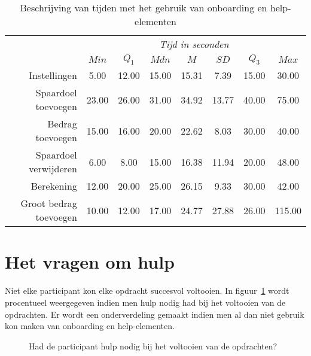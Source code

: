 \begin{table}[]
	\centering
	\begin{tabular}{r|ccccccc}
		\multicolumn{1}{l|}{} & \multicolumn{7}{c}{\textit{Tijd in seconden}} \\
		& $Min$ & $Q_1$ & $Mdn$ & $M$ & $SD$ & $Q_3$ & $Max$ \\ \hline
		Instellingen & 5.00 & 12.00 & 15.00 & 15.31 & 7.39 & 15.00 & 30.00 \\
		Spaardoel toevoegen & 23.00 & 26.00 & 31.00 & 34.92 & 13.77 & 40.00 & 75.00 \\
		Bedrag toevoegen & 15.00 & 16.00 & 20.00 & 22.62 & 8.03 & 30.00 & 40.00 \\
		Spaardoel verwijderen & 6.00 & 8.00 & 15.00 & 16.38 & 11.94 & 20.00 & 48.00 \\
		Berekening & 12.00 & 20.00 & 25.00 & 26.15 & 9.33 & 30.00 & 42.00 \\
		Groot bedrag toevoegen & 10.00 & 12.00 & 17.00 & 24.77 & 27.88 & 26.00 & 115.00
	\end{tabular}
	\caption{Beschrijving van tijden met het gebruik van onboarding en help-elementen}
	\label{tab:beschrijving-tijden-met-elementen}
\end{table}

\section{Het vragen om hulp}
\label{sec:vragen-hulp}

Niet elke participant kon elke opdracht succesvol voltooien. In figuur~\ref{fig:beschrijving-hulp} wordt procentueel weergegeven indien men hulp nodig had bij het voltooien van de opdrachten. Er wordt een onderverdeling gemaakt indien men al dan niet gebruik kon maken van onboarding en help-elementen.

\begin{figure}[h]
    \centering
    \qquad
    \qquad
    \qquad
    \qquad
    \qquad
    \caption{Had de participant hulp nodig bij het voltooien van de opdrachten?}
    \label{fig:beschrijving-hulp}
\end{figure}

